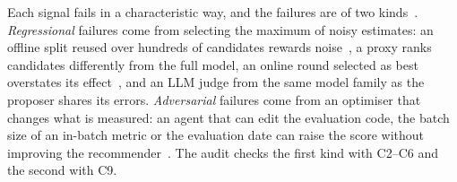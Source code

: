\documentclass[sigconf,nonacm]{acmart}
\begin{document}
Each signal fails in a characteristic way, and the failures are of two kinds~\cite{manheim2018goodhart}. \emph{Regressional}
failures come from selecting the maximum of noisy estimates: an offline split reused over hundreds of candidates rewards
noise~\cite{dwork2015reusable}, a proxy ranks candidates differently from the full model, an online round selected as best
overstates its effect~\cite{lee2018winnerscurse}, and an LLM judge from the same model family as the proposer shares its
errors. \emph{Adversarial} failures come from an optimiser that changes what is measured: an agent that can edit the
evaluation code, the batch size of an in-batch metric or the evaluation date can raise the score without improving the
recommender~\cite{skalse2022rewardhacking,zhong2026impossiblebench}. The audit checks the first kind with C2--C6 and the
second with C9.
\end{document}
